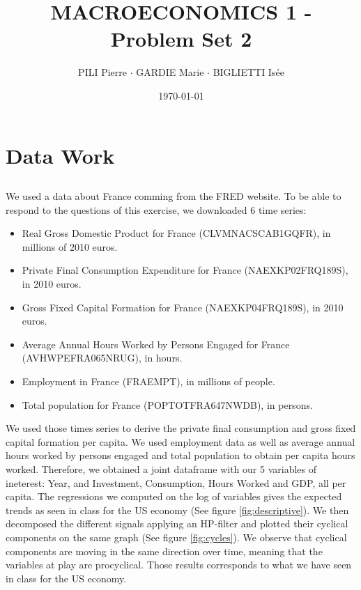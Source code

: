 \documentclass[12pt]{article}
\title{MACROECONOMICS 1 - Problem Set 2}
\author{PILI Pierre $\cdot$ GARDIE Marie $\cdot$ BIGLIETTI Isée}
\date{\today}
\begin{document}
\maketitle
\section{Data Work}
\subsection{}
We used a data about France comming from the FRED website. To be able to respond to the questions of this exercise, we downloaded 6 time series: 
\begin{itemize}
    \item Real Gross Domestic Product for France (CLVMNACSCAB1GQFR), in millions of 2010 euros.
    \item Private Final Consumption Expenditure for France (NAEXKP02FRQ189S), in 2010 euros.
    \item Gross Fixed Capital Formation for France (NAEXKP04FRQ189S), in 2010 euros.
    \item Average Annual Hours Worked by Persons Engaged for France (AVHWPEFRA065NRUG), in hours.
    \item Employment in France (FRAEMPT), in millions of people.
    \item Total population for France (POPTOTFRA647NWDB), in persons.
\end{itemize}
We used those times series to derive the private final consumption and gross fixed capital formation per capita.
We used employment data as well as average annual hours worked by persons engaged and total population to obtain per capita hours worked. 
Therefore, we obtained a joint dataframe with our 5 variables of ineterest: Year, and Investment, Consumption, Hours Worked and GDP, all per capita.
The regressions we computed on the log of variables gives the expected trends as seen in class for the US economy (See figure \ref{fig:descriptive}).
We then decomposed the different signals applying an HP-filter and plotted their cyclical components on the same graph (See figure \ref{fig:cycles}).
We observe that cyclical components are moving in the same direction over time, meaning that the variables at play are procyclical.
Those results corresponds to what we have seen in class for the US economy.
\end{document}
